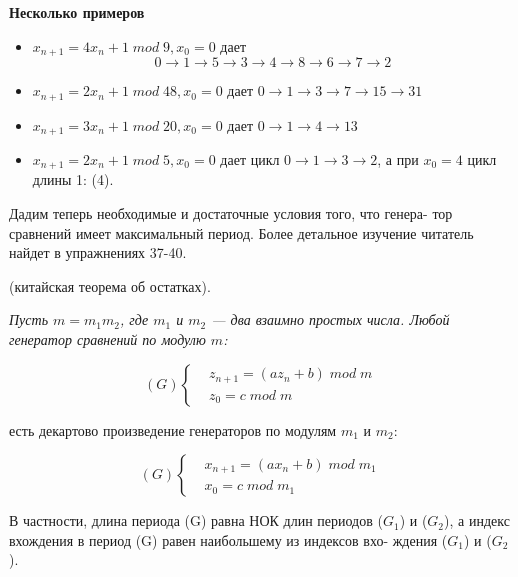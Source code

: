 \documentclass{../template/mai_book}
\begin{document}
\textbf{Несколько примеров} \begin{itemize}
\item $x_{n+1} = 4x_{n}+1 \; mod \; 9, x_{0} = 0$ дает 
$$0 \to 1 \to 5 \to 3 \to 4 \to 8 \to 6 \to 7 \to 2$$
\item $x_{n+1} = 2x_{n} + 1 \; mod \; 48, x_{0} = 0$ дает $0 \to 1 \to 3 \to 7 \to 15 \to 31$
\item $x_{n+1} = 3x_{n} + 1 \; mod \; 20, x_{0} = 0$ дает $0 \to 1 \to 4 \to 13$
\item $x_{n+1} = 2x_{n} + 1 \; mod \; 5, x_{0} = 0$ дает цикл $0 \to 1 \to 3 \to 2$, а при \linebreak $x_{0} = 4$ цикл длины 1: (4).
\end{itemize}
Дадим теперь необходимые и достаточные условия того, что генера- \linebreak  тор сравнений имеет максимальный период. Более детальное изучение \linebreak читатель найдет в упражнениях 37-40. \par 
\begin{predl} (китайская теорема об остатках). \par
\indent\slshape{Пусть $m = m_{1}m_{2}$, где  $m_{1}$ и $m_{2}$} --- два взаимно простых числа. Любой \linebreak генератор сравнений по модулю $m$: \par 

\begin{equation*}
(G) 
 \begin{cases}
   &\text{$z_{n+1} = (az_{n} + b) \; mod \; m$}\\
   &\text{$z_{0} = c \; mod \; m$}
 \end{cases}
\end{equation*}

\noindent есть декартово произведение генераторов по модулям $m_{1}$ и $m_{2}$: \linebreak
 
 \begin{equation*}
(G) 
 \begin{cases}
   &\text{$x_{n+1} = (ax_{n} + b) \; mod \; m_{1}$}\\
   &\text{$x_{0} = c \; mod \; m_{1}$}
 \end{cases}
\end{equation*}
 
 
\noindent В частности, длина периода (G) равна НОК длин периодов ($G_{1}$) и ($G_{2}$), \linebreak а индекс вхождения в период (G) равен наибольшему из индексов вхо- \linebreak ждения ($G_{1}$) и ($G_{2}$). \par
\end{predl} 
\end{document}
